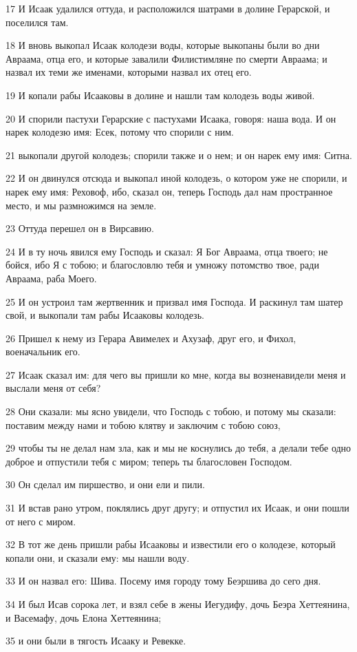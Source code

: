 \par 17 И Исаак удалился оттуда, и расположился шатрами в долине Герарской, и поселился там.
\par 18 И вновь выкопал Исаак колодези воды, которые выкопаны были во дни Авраама, отца его, и которые завалили Филистимляне по смерти Авраама; и назвал их теми же именами, которыми назвал их отец его.
\par 19 И копали рабы Исааковы в долине и нашли там колодезь воды живой.
\par 20 И спорили пастухи Герарские с пастухами Исаака, говоря: наша вода. И он нарек колодезю имя: Есек, потому что спорили с ним.
\par 21 выкопали другой колодезь; спорили также и о нем; и он нарек ему имя: Ситна.
\par 22 И он двинулся отсюда и выкопал иной колодезь, о котором уже не спорили, и нарек ему имя: Реховоф, ибо, сказал он, теперь Господь дал нам пространное место, и мы размножимся на земле.
\par 23 Оттуда перешел он в Вирсавию.
\par 24 И в ту ночь явился ему Господь и сказал: Я Бог Авраама, отца твоего; не бойся, ибо Я с тобою; и благословлю тебя и умножу потомство твое, ради Авраама, раба Моего.
\par 25 И он устроил там жертвенник и призвал имя Господа. И раскинул там шатер свой, и выкопали там рабы Исааковы колодезь.
\par 26 Пришел к нему из Герара Авимелех и Ахузаф, друг его, и Фихол, военачальник его.
\par 27 Исаак сказал им: для чего вы пришли ко мне, когда вы возненавидели меня и выслали меня от себя?
\par 28 Они сказали: мы ясно увидели, что Господь с тобою, и потому мы сказали: поставим между нами и тобою клятву и заключим с тобою союз,
\par 29 чтобы ты не делал нам зла, как и мы не коснулись до тебя, а делали тебе одно доброе и отпустили тебя с миром; теперь ты благословен Господом.
\par 30 Он сделал им пиршество, и они ели и пили.
\par 31 И встав рано утром, поклялись друг другу; и отпустил их Исаак, и они пошли от него с миром.
\par 32 В тот же день пришли рабы Исааковы и известили его о колодезе, который копали они, и сказали ему: мы нашли воду.
\par 33 И он назвал его: Шива. Посему имя городу тому Беэршива до сего дня.
\par 34 И был Исав сорока лет, и взял себе в жены Иегудифу, дочь Беэра Хеттеянина, и Васемафу, дочь Елона Хеттеянина;
\par 35 и они были в тягость Исааку и Ревекке.

